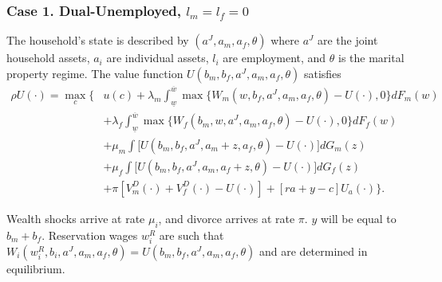 \documentclass{article}
\begin{document}
\subsubsection*{Case 1. Dual-Unemployed, $l_m = l_f = 0$}
The household's state is described by $(a^J, a_m, a_f,\theta)$ where $a^J$ are the joint household assets, $a_i$ are individual assets, $l_i$ are employment, and $\theta$ is the marital property regime.  The value function $U(b_m,b_f,a^J, a_m, a_f,\theta)$ satisfies
\begin{align*}
    \rho U(\cdot)= \max_c\bigg\{&u(c)+\lambda_m\int_{\underline{w}}^{\overline{w}}\max\big\{W_m(w,b_f,a^J,a_m,a_f,\theta)-U(\cdot),0\big\}dF_m(w)\\&+\lambda_f\int_{\underline{w}}^{\overline{w}}\max\big\{W_f(b_m,w,a^J,a_m,a_f,\theta)-U(\cdot),0\big\}dF_f(w)\\&+\mu_m\int\big[U(b_m,b_f,a^J,a_m+z,a_f,\theta)-U(\cdot)\big]dG_m(z)\\&+\mu_f\int\big[U(b_m,b_f,a^J,a_m,a_f+z,\theta)-U(\cdot)\big]dG_f(z)\\&+\pi\left[V_m^D(\cdot)+V_f^D(\cdot)-U(\cdot)\right] + [ra + y - c]U_a(\cdot) \bigg\}.
\end{align*}

Wealth shocks arrive at rate $\mu_i$, and divorce arrives at rate $\pi$. $y$ will be equal to $b_m+ b_f$. Reservation wages $w_i^R$ are such that $W_i(w_i^R,b_i,a^J,a_m,a_f,\theta)=U(b_m,b_f,a^J,a_m,a_f,\theta)$ and are determined in equilibrium. 
\end{document}
